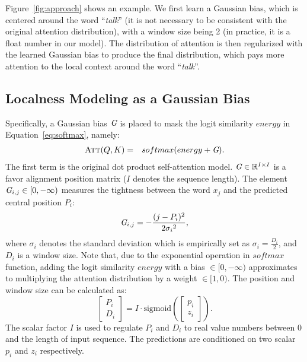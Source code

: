 \documentclass[11pt,a4paper]{article}
\begin{document}
Figure~\ref{fig:approach} shows an example. We first learn a Gaussian bias, which is centered around the word ``{\em talk}'' (it is not necessary to be consistent with the original attention distribution), with a window size being 2 (in practice, it is a float number in our model). 
The distribution of attention is then regularized with the learned Gaussian bias to produce the final distribution, which pays more  
attention to the local context around the word ``{\em talk}''.



\iffalse
Contrast to \cite{luong2015effective} who applied {\em local attention} into vanilla attention model with a fixed window size, we introduce more effective and flexible strategies for the predicting the local scope of self-attention model.
\fi



\subsection{\bf Localness Modeling as a Gaussian Bias}
\label{sec:gaussian}
Specifically, a  Gaussian bias $\emph{G}$ is placed to mask the logit similarity $energy$ in Equation~\ref{eq:softmax}, namely:
\begin{eqnarray}
    \textsc{Att}(Q, K) &=& softmax(energy + \emph{G}).  
\end{eqnarray}
The first term is the original dot product self-attention model.
$\emph{G}\in \mathbb{R}^{I\times I}$ is a favor alignment position matrix ($I$ denotes the sequence length). The element $\emph{G}_{i,j} \in [0,-\infty)$ measures the tightness between the word $x_j$ and the predicted central position $P_i$:
 \begin{equation}  
  \emph{G}_{i,j} = -\frac{(j-P_i)^2}{2{\sigma_i}^2},\end{equation}  
where $\sigma_i$ denotes the standard deviation which is empirically set as $\sigma_i = \frac{D_i}{2}$, and $D_i$ is a window size. Note that, due to the exponential operation in $softmax$ function, adding the logit similarity $energy$ with a bias $\in [0,-\infty)$ approximates to multiplying the attention distribution by a weight $\in [1,0)$. The position and window size can be calculated as:
\begin{equation}
 \begin{bmatrix}
 P_i\\ 
D_i
\end{bmatrix} = I \cdot \text{sigmoid}(\begin{bmatrix}
 p_i\\ 
z_i
\end{bmatrix}).
\label{eqn:gaussian}
\end{equation}
The scalar factor $I$ is used to regulate $P_i$ and $D_i$ to real value numbers between $0$ and the length of input sequence. The predictions are conditioned on two scalar $p_i$ and $z_i$ respectively. 
\end{document}
